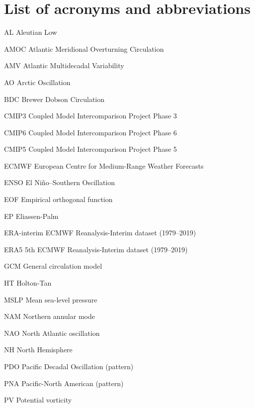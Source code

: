 \chapter*{List of acronyms and abbreviations}

\begin{description*}

\item[AL] Aleutian Low
\item[AMOC] Atlantic Meridional Overturning Circulation
\item[AMV] Atlantic Multidecadal Variability
\item[AO] Arctic Oscillation
\item[BDC] Brewer Dobson Circulation
\item[CMIP3] Coupled Model Intercomparison Project Phase 3
\item[CMIP6] Coupled Model Intercomparison Project Phase 6
\item[CMIP5] Coupled Model Intercomparison Project Phase 5
\item[ECMWF] European Centre for Medium-Range Weather Forecasts
\item[ENSO] El Ni\~no--Southern Oscillation
\item[EOF] Empirical orthogonal function
\item[EP] Eliassen-Palm
\item[ERA-interim] ECMWF Reanalysis-Interim dataset (1979--2019)
\item[ERA5] 5th ECMWF Reanalysis-Interim dataset (1979--2019)
\item[GCM] General circulation model
\item[HT] Holton-Tan
\item[MSLP] Mean sea-level pressure
\item[NAM] Northern annular mode
\item[NAO] North Atlantic oscillation
\item[NH] North Hemisphere
\item[PDO] Pacific Decadal Oscillation (pattern)
\item[PNA] Pacific-North American (pattern)
\item[PV] Potential vorticity

\end{description*}
